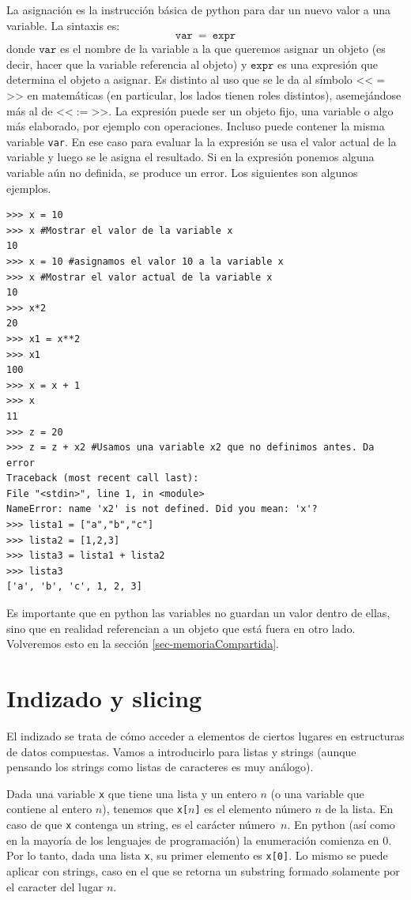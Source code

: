 \documentclass[a4paper, 12pt]{report}
\theoremstyle{definition}
\begin{document}
La asignación es la instrucción básica de python para dar un nuevo valor a una variable. La sintaxis es:
$$\mathtt{var}~=~\mathtt{expr}$$
donde $\mathtt{var}$ es el nombre de la variable a la que queremos asignar un objeto (es decir, hacer que la variable referencia al objeto) y $\mathtt{expr}$ es una expresión que determina el objeto a asignar.  Es distinto al uso que se le da al símbolo <<$=$>> en matemáticas (en particular, los lados tienen roles distintos), asemejándose más al de <<$:=$>>. La expresión puede ser un objeto fijo, una variable o algo más elaborado, por ejemplo con operaciones. Incluso puede contener la misma variable {\tt var}. En ese caso para evaluar la la expresión se usa el valor actual de la variable y luego se le asigna el resultado. Si en la expresión ponemos alguna variable aún no definida, se produce un error. Los siguientes son algunos ejemplos.

\begin{verbatim}
>>> x = 10
>>> x #Mostrar el valor de la variable x
10
>>> x = 10 #asignamos el valor 10 a la variable x
>>> x #Mostrar el valor actual de la variable x
10
>>> x*2
20
>>> x1 = x**2
>>> x1
100
>>> x = x + 1
>>> x
11
>>> z = 20
>>> z = z + x2 #Usamos una variable x2 que no definimos antes. Da error
Traceback (most recent call last):
File "<stdin>", line 1, in <module>
NameError: name 'x2' is not defined. Did you mean: 'x'?
>>> lista1 = ["a","b","c"]
>>> lista2 = [1,2,3]
>>> lista3 = lista1 + lista2
>>> lista3
['a', 'b', 'c', 1, 2, 3]
\end{verbatim}
Es importante que en python las variables no guardan un valor dentro de ellas, sino que en realidad referencian a un objeto que está fuera en otro lado. Volveremos esto en la sección \ref{sec-memoriaCompartida}.
\section{Indizado y slicing}

El indizado se trata de cómo acceder a elementos de ciertos lugares en estructuras de datos compuestas. Vamos a introducirlo para listas y strings (aunque pensando los strings como listas de caracteres es muy análogo).

Dada una variable {\tt x} que tiene una lista y un entero $n$ (o una variable que contiene al entero $n$), tenemos que {\tt x[$n$]} es el elemento número $n$ de la lista. En caso de que {\tt x} contenga un string, es el carácter número~$n$. En python (así como en la mayoría de los lenguajes de programación) la enumeración comienza en 0. Por lo tanto, dada una lista {\tt x}, su primer elemento es {\tt x[0]}. Lo mismo se puede aplicar con strings, caso en el que se retorna un substring formado solamente por el caracter del lugar $n$.
\end{document}

